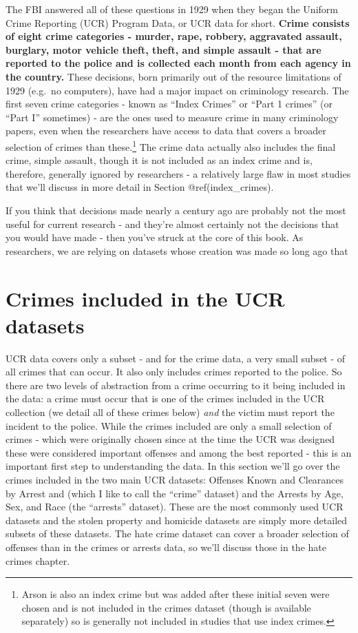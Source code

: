 \documentclass[
  12pt,
  openany]{book}
\begin{document}
The FBI answered all of these questions in 1929 when they began the Uniform Crime Reporting (UCR) Program Data, or UCR data for short. \textbf{Crime consists of eight crime categories - murder, rape, robbery, aggravated assault, burglary, motor vehicle theft, theft, and simple assault - that are reported to the police and is collected each month from each agency in the country.} These decisions, born primarily out of the resource limitations of 1929 (e.g.~no computers), have had a major impact on criminology research. The first seven crime categories - known as ``Index Crimes'' or ``Part 1 crimes'' (or ``Part I'' sometimes) - are the ones used to measure crime in many criminology papers, even when the researchers have access to data that covers a broader selection of crimes than these.\footnote{Arson is also an index crime but was added after these initial seven were chosen and is not included in the crimes dataset (though is available separately) so is generally not included in studies that use index crimes.} The crime data actually also includes the final crime, simple assault, though it is not included as an index crime and is, therefore, generally ignored by researchers - a relatively large flaw in most studies that we'll discuss in more detail in Section @ref(index\_crimes).

If you think that decisions made nearly a century ago are probably not the most useful for current research - and they're almost certainly not the decisions that you would have made - then you've struck at the core of this book. As researchers, we are relying on datasets whose creation was made so long ago that

\hypertarget{crimes-included-in-the-ucr-datasets}{%
\section{Crimes included in the UCR datasets}\label{crimes-included-in-the-ucr-datasets}}

UCR data covers only a subset - and for the crime data, a very small subset - of all crimes that can occur. It also only includes crimes reported to the police. So there are two levels of abstraction from a crime occurring to it being included in the data: a crime must occur that is one of the crimes included in the UCR collection (we detail all of these crimes below) \emph{and} the victim must report the incident to the police. While the crimes included are only a small selection of crimes - which were originally chosen since at the time the UCR was designed these were considered important offenses and among the best reported - this is an important first step to understanding the data. In this section we'll go over the crimes included in the two main UCR datasets: Offenses Known and Clearances by Arrest and (which I like to call the ``crime'' dataset) and the Arrests by Age, Sex, and Race (the ``arrests'' dataset). These are the most commonly used UCR datasets and the stolen property and homicide datasets are simply more detailed subsets of these datasets. The hate crime dataset can cover a broader selection of offenses than in the crimes or arrests data, so we'll discuss those in the hate crimes chapter.
\end{document}
